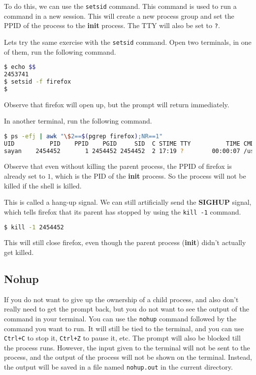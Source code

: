 To do this, we can use the \lstinline|setsid| command. This command is used to
run a command in a new session. This will create a new process group and
set the PPID of the process to the \textbf{init} process. The TTY will also
be set to \lstinline|?|.

Lets try the same exercise with the \lstinline|setsid| command.
Open two terminals, in one of them, run the following command.

\begin{lstlisting}[language=bash]
$ echo $$
2453741
$ setsid -f firefox
$
\end{lstlisting}

Observe that firefox will open up, but the prompt will return immediately.

In another terminal, run the following command.

\begin{lstlisting}[language=bash]
$ ps -efj | awk "\$2==$(pgrep firefox);NR==1"
UID          PID    PPID    PGID     SID  C STIME TTY          TIME CMD
sayan    2454452       1 2454452 2454452  2 17:19 ?        00:00:07 /usr/lib/firefox/firefox
\end{lstlisting}

Observe that even without killing the parent process, the PPID of firefox is
already set to $1$, which is the PID of the \textbf{init} process.
So the process will not be killed if the shell is killed.

This is called a hang-up signal. We can still artificially send the
\textbf{SIGHUP} signal, which tells firefox that its parent has stopped
by using the \lstinline|kill -1| command.

\begin{lstlisting}[language=bash]
$ kill -1 2454452
\end{lstlisting}

This will still close firefox, even though the parent process (\textbf{init})
didn't actually get killed.

\subsection{Nohup}

If you do not want to give up the ownership of a child process,
and also don't really need to get the prompt back, but you do not
want to see the output of the command in your terminal. You can
use the \lstinline|nohup| command followed by the command you want to
run. It will still be tied to the terminal, and you can use
\lstinline|Ctrl+C| to stop it, \lstinline|Ctrl+Z| to pause it, etc.
The prompt will also be blocked till the process runs.
However, the input given to the terminal will not be sent
to the process, and the output of the process will not be
shown on the terminal. Instead, the output will be saved
in a file named \lstinline|nohup.out| in the current directory.

